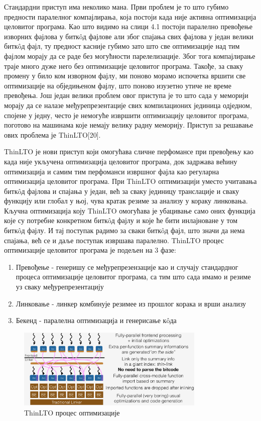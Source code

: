 \documentclass[12pt,oneside]{memoir}
\begin{document}
Стандардни приступ има неколико мана.
Први проблем је то што губимо предности паралелног компајлирања, која постоји 
када није активна оптимизација целовитог програма.
Као што видимо на слици 4.1 постоји паралелно превођење изворних фајлова у 
битк\^{o}д фајлове али због спајања свих фајлова у један велики битк\^{o}д фајл,
ту предност касније губимо зато што све оптимизације над тим фајлом морају 
да се раде без могућности парелелизације.
Због тога компајлирање траје много дуже него без оптимизације целовитог програма.
Такође, за сваку промену у било ком изворном фајлу, ми поново морамо испочетка
вршити све оптимизације на обједињеном фајлу, што поново изузетно утиче не време
превођења.
Још један велики проблем овог приступа је то што сада у меморији морају да се налазе  међурепрезентације свих компилационих јединица одједном, спојене
у једну, често је немогуће извршити оптимизацију целовитог програма, поготово на 
машинама које немају велику радну меморију.
Приступ за решавање ових проблема је  ThinLTO[20].
\par ThinLTO је нови приступ који омогућава сличне перфомансе при превођењу
као када није укључена оптимизација целовитог програма, док задржава већину
оптимизација и самим тим перфоманси извршног фајла као регуларна оптимизација
целовитог програма.
При ThinLTO оптимизацији уместо учитавања битк\^{o}д фајлова и спајања у један,
већ за сваку јединицу транслације и сваку функцију или глобал у њој, чува кратак
резиме за анализу у кораку линковања. 
Кључна оптимизација коју ThinLTO омогућава је убацивање само оних функција које
су потребне конкретном битк\^{o}д фајлу и које ће бити инлајноване у том  битк\^{o}д фајлу.
И тај поступак радимо за сваки  битк\^{o}д фајл, што значи да нема спајања, већ се и
даље поступак  извршава паралелно.
ThinLTO процес оптимизације целовитог програма је подељен на 3 фазе:
\begin{enumerate}
\item Превођење - генеришу се међурепрезензације као и случају стандардног процеса
	оптимизације целовитог програма, са тим што сада имамо и резиме уз сваку
	међурепрезентацију
\item Линковање - линкер комбинује резимее из прошлог корака и врши анализу
\item Бекенд - паралелна оптимизација и генерисање к\^{o}да
\end{enumerate}
 
\begin{figure}[!ht]
  \centering
  \includegraphics[width=0.8\textwidth]{LTO_thin.png}
  \caption{ThinLTO процес оптимизације}
  \label{fig:grafikon}
\end{figure}
\end{document}
